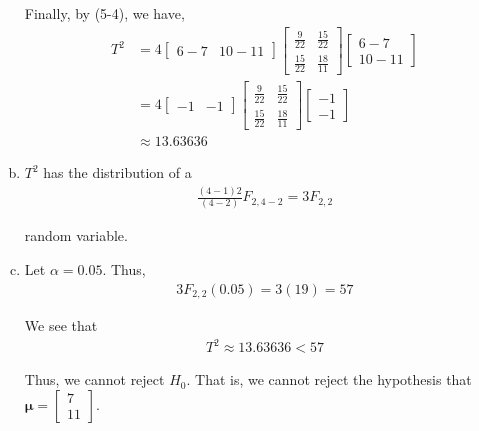 \documentclass[12pt]{article}\usepackage[]{graphicx}\usepackage[]{color}
\newenvironment{problem}[2][Problem]{\begin{trivlist}
\item[\hskip \labelsep {\bfseries #1}\hskip \labelsep {\bfseries #2.}]}{\end{trivlist}}
\newcommand{\vct}{\mathbf}
\begin{document}
\begin{enumerate}[a)]
Finally, by (5-4), we have,
\begin{align*}
T^2 &= 4 \begin{bmatrix} 6-7 & 10-11 \end{bmatrix} \begin{bmatrix} \frac{9}{22} & \frac{15}{22} \\ \frac{15}{22} & \frac{18}{11} \end{bmatrix} \begin{bmatrix} 6-7 \\ 10-11 \end{bmatrix}\\
&= 4 \begin{bmatrix} -1 & -1 \end{bmatrix} \begin{bmatrix} \frac{9}{22} & \frac{15}{22} \\ \frac{15}{22} & \frac{18}{11} \end{bmatrix} \begin{bmatrix} -1 \\ -1 \end{bmatrix}\\
&\approx 13.63636 
\end{align*}

\item $T^2$ has the distribution of a 
\begin{align*}
\frac{(4-1)2}{(4-2)} F_{2, 4-2} = 3F_{2, 2}
\end{align*}

random variable.

\item Let $\alpha = 0.05$. Thus,
\begin{align*}
3F_{2, 2}(0.05) = 3(19) = 57
\end{align*}

We see that
\begin{align*}
T^2 \approx 13.63636 < 57
\end{align*}

Thus, we cannot reject $H_0$. That is, we cannot reject the hypothesis that $\vct{\mu} = \begin{bmatrix} 7 \\ 11 \end{bmatrix}$.
\end{enumerate}


\begin{problem}{5.5}
\end{problem}
\end{document}
